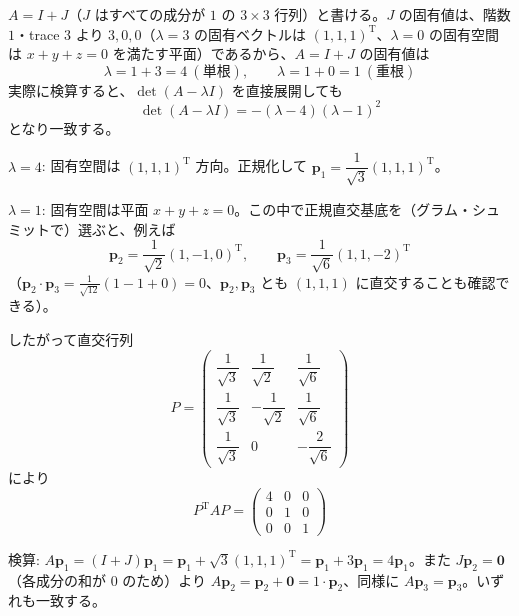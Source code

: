 
$A = I + J$（$J$ はすべての成分が $1$ の $3\times3$ 行列）と書ける。$J$ の固有値は、階数 $1$・trace $3$ より $3, 0, 0$（$\lambda=3$ の固有ベクトルは $(1,1,1)^{\mathrm{T}}$、$\lambda=0$ の固有空間は $x+y+z=0$ を満たす平面）であるから、$A = I+J$ の固有値は
\[
\lambda = 1+3 = 4 \ (\text{単根}), \qquad \lambda = 1+0 = 1 \ (\text{重根})
\]
実際に検算すると、$\det(A - \lambda I)$ を直接展開しても
\[
\det(A-\lambda I) = -(\lambda-4)(\lambda-1)^{2}
\]
となり一致する。

$\lambda = 4$: 固有空間は $(1,1,1)^{\mathrm{T}}$ 方向。正規化して $\bm{p}_1 = \dfrac{1}{\sqrt{3}}(1,1,1)^{\mathrm{T}}$。

$\lambda = 1$: 固有空間は平面 $x+y+z=0$。この中で正規直交基底を（グラム・シュミットで）選ぶと、例えば
\[
\bm{p}_2 = \frac{1}{\sqrt{2}}(1,-1,0)^{\mathrm{T}}, \qquad
\bm{p}_3 = \frac{1}{\sqrt{6}}(1,1,-2)^{\mathrm{T}}
\]
（$\bm{p}_2 \cdot \bm{p}_3 = \frac{1}{\sqrt{12}}(1-1+0)=0$、$\bm{p}_2, \bm{p}_3$ とも $(1,1,1)$ に直交することも確認できる）。

したがって直交行列
\[
P = \begin{pmatrix}
\dfrac{1}{\sqrt3} & \dfrac{1}{\sqrt2} & \dfrac{1}{\sqrt6} \\[6pt]
\dfrac{1}{\sqrt3} & -\dfrac{1}{\sqrt2} & \dfrac{1}{\sqrt6} \\[6pt]
\dfrac{1}{\sqrt3} & 0 & -\dfrac{2}{\sqrt6}
\end{pmatrix}
\]
により
\[
\boxed{\; P^{\mathrm{T}} A P = \begin{pmatrix} 4 & 0 & 0 \\ 0 & 1 & 0 \\ 0 & 0 & 1 \end{pmatrix} \;}
\]

検算: $A\bm{p}_1 = (I+J)\bm{p}_1 = \bm{p}_1 + \sqrt3(1,1,1)^{\mathrm{T}} = \bm{p}_1 + 3\bm{p}_1 = 4\bm{p}_1$。また $J\bm{p}_2 = \bm{0}$（各成分の和が $0$ のため）より $A\bm{p}_2 = \bm{p}_2 + \bm{0} = 1\cdot\bm{p}_2$、同様に $A\bm{p}_3 = \bm{p}_3$。いずれも一致する。
